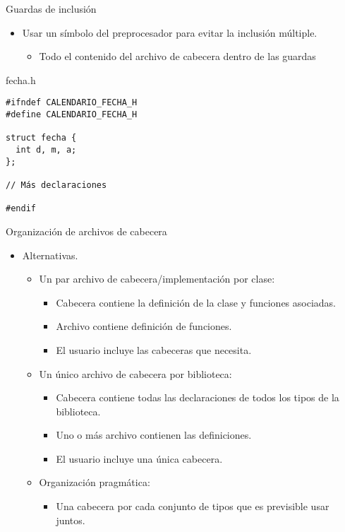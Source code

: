 \begin{frame}[fragile]{Guardas de inclusión}
\begin{itemize}
  \item Usar un símbolo del preprocesador para evitar la inclusión múltiple.
    \begin{itemize}
      \item Todo el contenido del archivo de cabecera dentro de las guardas
    \end{itemize}
\end{itemize}
\begin{block}{fecha.h}
\begin{lstlisting}
#ifndef CALENDARIO_FECHA_H
#define CALENDARIO_FECHA_H

struct fecha {
  int d, m, a;
};

// Más declaraciones

#endif
\end{lstlisting}
\end{block}
\end{frame}

\begin{frame}{Organización de archivos de cabecera}
\begin{itemize}
  \item Alternativas.
    \begin{itemize}
      \item Un par archivo de cabecera/implementación por clase:
        \begin{itemize}
          \item Cabecera contiene la definición de la clase y funciones asociadas.
          \item Archivo  contiene definición de funciones.
          \item El usuario incluye las cabeceras que necesita.
        \end{itemize}
      \item Un único archivo de cabecera por biblioteca:
        \begin{itemize}
          \item Cabecera contiene todas las declaraciones de todos los tipos de la biblioteca.
          \item Uno o más archivo  contienen las definiciones.
          \item El usuario incluye una única cabecera.
        \end{itemize}
      \item Organización pragmática:
        \begin{itemize}
          \item Una cabecera por cada conjunto de tipos que es previsible usar juntos.
        \end{itemize}
    \end{itemize}
\end{itemize}
\end{frame}

